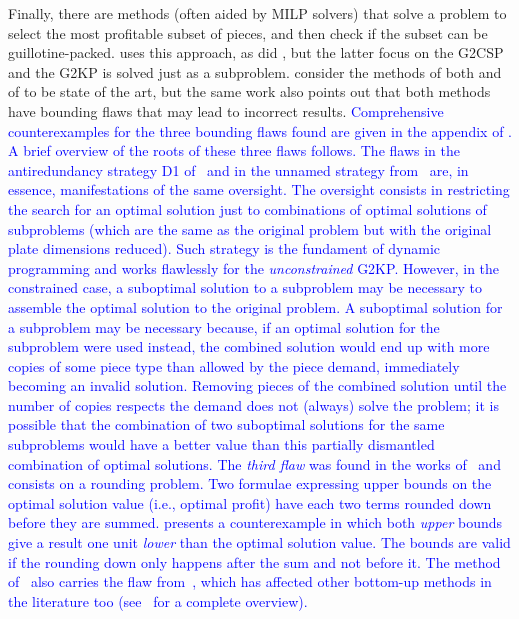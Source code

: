 \documentclass[ppgc,tese,english,formais,babel]{iiufrgs}
\newif\iffinalversion
\newcommand{\newtext}[1]{\iffinalversion%
#1%
\else%
\textcolor{blue}{#1}%
\fi%
}
\begin{document}
Finally, there are methods (often aided by MILP solvers) that solve a problem to select the most profitable subset of pieces, and then check if the subset can be guillotine-packed.
\citet{dolatabadi:2012} uses this approach, as did \citet{pisinger:2007}, but the latter focus on the G2CSP and the G2KP is solved just as a subproblem.
\citet{russo:2020} consider the methods of both \citet{dolatabadi:2012} and of \citet{yoon:2013} to be state of the art, but the same work also points out that both methods have bounding flaws that may lead to incorrect results.
\newtext{
Comprehensive counterexamples for the three bounding flaws found are given in the appendix of \citet{russo:2020}.
A brief overview of the roots of these three flaws follows.
The flaws in the antiredundancy strategy D1 of~\citet{cung:2000} and in the unnamed strategy from~\citet{dolatabadi:2012} are, in essence, manifestations of the same oversight.
The oversight consists in restricting the search for an optimal solution just to combinations of optimal solutions of subproblems (which are the same as the original problem but with the original plate dimensions reduced).
Such strategy is the fundament of dynamic programming and works flawlessly for the \emph{unconstrained} G2KP.
However, in the constrained case, a suboptimal solution to a subproblem may be necessary to assemble the optimal solution to the original problem.
A suboptimal solution for a subproblem may be necessary because, if an optimal solution for the subproblem were used instead, the combined solution would end up with more copies of some piece type than allowed by the piece demand, immediately becoming an invalid solution.
Removing pieces of the combined solution until the number of copies respects the demand does not (always) solve the problem; it is possible that the combination of two suboptimal solutions for the same subproblems would have a better value than this partially dismantled combination of optimal solutions.
The \emph{third flaw} was found in the works of~\citet{kang:2003,kang:2011,yoon:2013} and consists on a rounding problem.
Two formulae expressing upper bounds on the optimal solution value (i.e., optimal profit) have each two terms rounded down before they are summed.
\citet{russo:2020} presents a counterexample in which both \emph{upper} bounds give a result one unit \emph{lower} than the optimal solution value.
The bounds are valid if the rounding down only happens after the sum and not before it.
The method of~\citet{yoon:2013} also carries the flaw from~\citet{cung:2000}, which has affected other bottom-up methods in the literature too (see~\citet{russo:2020} for a complete overview).
}
\end{document}

